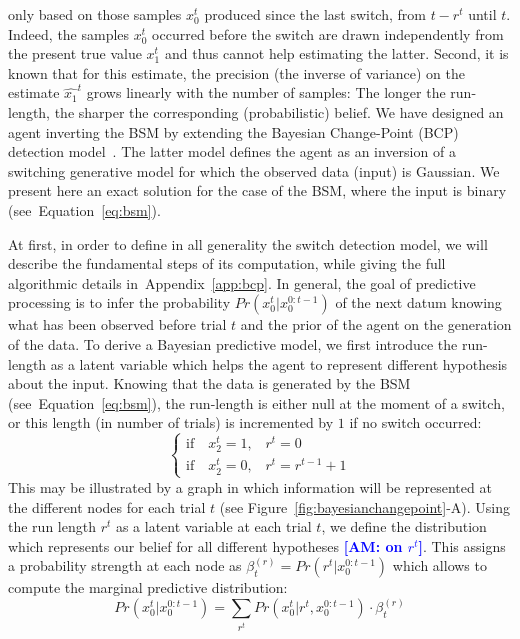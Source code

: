 \documentclass[12pt,english]{article}%
\newcommand{\choice}[1]{ %
	\left\{ %
		\begin{array}{l} #1 \end{array} %
	\right. }
\newcommand{\eql}[1]{\begin{equation}#1\end{equation}}
\newcommand{\citep}[1]{\parencite{#1}}
\newcommand{\seeFig}[1]{Figure~\ref{fig:#1}}
\newcommand{\seeEq}[1]{Equation~\ref{eq:#1}}
\newcommand{\seeApp}[1]{Appendix~\ref{app:#1}}
\newcommand{\AM}[1]{\textbf{\textcolor{blue}{[AM: #1]}}}
\begin{document}
only based on those samples $x_0^t$ produced since the last switch, from $t-r^t$ until $t$.
Indeed, the samples $x_0^t$ occurred before the switch are drawn independently from the present true value $x_1^t$
and thus cannot help estimating the latter.
Second, it is known that for this estimate, the precision
(the inverse of variance) on the estimate $\hat{x_1}^{t}$
grows linearly with the number of samples:
The longer the run-length, the sharper the corresponding (probabilistic) belief.
We have designed an agent inverting the BSM by extending
the Bayesian Change-Point (BCP) detection model~\citep{AdamsMackay2007}.
The latter model defines the agent as an inversion of a switching generative model
for which the observed data (input) is Gaussian.
We present here an exact solution for the case of the BSM, where the input is binary (see~\seeEq{bsm}).

At first, in order to define in all generality the switch detection model,
we will describe the fundamental steps of its computation,
while giving the full algorithmic details in~\seeApp{bcp}.
In general, the goal of predictive processing
is to infer the probability $Pr(x_0^t | x_0^{0:t-1})$ of the next datum
knowing what has been observed before trial $t$ and
the prior of the agent on the generation of the data.
To derive a Bayesian predictive model, we first introduce
the run-length as a latent variable which helps the agent to represent
different hypothesis about the input.
Knowing that the data is generated by the BSM (see~\seeEq{bsm}),
the run-length is either null at the moment of a switch,
or this length (in number of trials) is incremented by $1$ if no switch occurred:
\eql{\choice{
\text{if} \quad x_2^t=1 \text{,} \quad r^t = 0\\
\text{if} \quad x_2^t=0 \text{,} \quad r^t = r^{t-1} +1 }\label{eq:run_length}}%
This may be illustrated by a graph
in which information will be represented at the different nodes for each trial $t$ (see \seeFig{bayesianchangepoint}-A).
Using the run length $r^t$ as a latent variable at each trial $t$,
we define the distribution which represents our belief
for all different hypotheses \AM{on $r^t$}.
This assigns a probability strength at each node
as $\beta^{(r)}_t=Pr(r^t | x_0^{0:t-1})$
which allows to compute the marginal predictive distribution:
\eql{
Pr(x_0^t | x_0^{0:t-1}) = \sum_{r^{t}} Pr(x_0^t | r^{t}, x_0^{0:t-1}) \cdot  \beta^{(r)}_t
\label{eq:pred}
}
\end{document}
